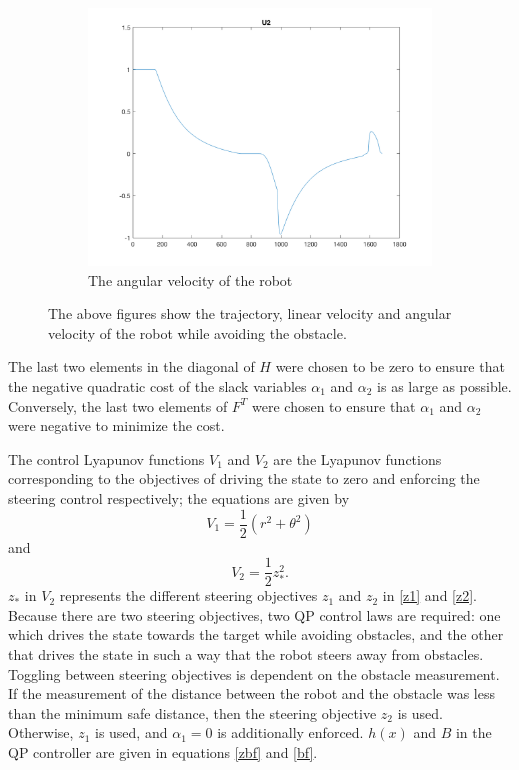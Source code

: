 \documentclass[conference]{IEEEtran}
\begin{document}
\begin{figure}[t!]
\begin{subfigure}[t]{0.32\textwidth}
\includegraphics[scale=0.15]{U2.png} 
\caption{The angular velocity of the robot \label{fig:delta}} 
\end{subfigure}
\caption{The above figures show the trajectory, linear velocity and angular velocity of the robot while avoiding the obstacle.\label{fig:state}}
\end{figure} \fi

The last two elements in the diagonal of $H$ were chosen to be zero to ensure that the negative quadratic cost of the slack variables $\alpha_1$ and $\alpha_2$ is as large as possible. Conversely, the last two elements of $F^T$ were chosen to ensure that $\alpha_1$ and $\alpha_2$ were negative to minimize the cost.

The control Lyapunov functions $V_1$ and $V_2$ are the Lyapunov functions corresponding to the objectives of driving the state to zero and enforcing the steering control respectively; the equations are given by 
\begin{equation}
V_1=\frac{1}{2}(r^2+\theta^2)
\end{equation} and
\begin{equation}
V_2=\frac{1}{2}z_*^2.
\end{equation}
$z_*$ in $V_2$ represents the different steering objectives $z_1$ and $z_2$ in \eqref{z1} and \eqref{z2}. Because there are two steering objectives, two QP control laws are required: one which drives the state towards the target while avoiding obstacles, and the other that drives the state in such a way that the robot steers away from obstacles. Toggling between steering objectives is dependent on the obstacle measurement. If the measurement of the distance between the robot and the obstacle was less than the minimum safe distance, then the steering objective $z_2$ is used. Otherwise, $z_1$ is used, and $\alpha_1=0$ is additionally enforced. $h(x)$ and $B$ in the QP controller are given in equations \eqref{zbf} and \eqref{bf}. 
\end{document}
